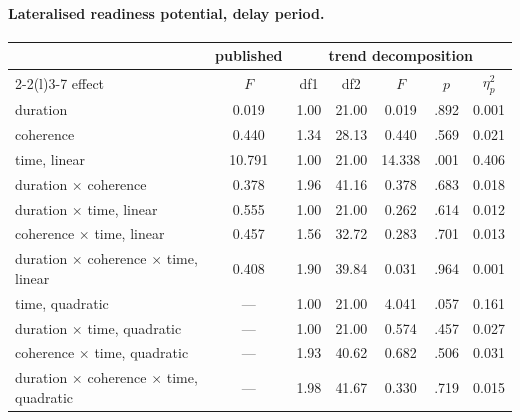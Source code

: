 \paragraph{Lateralised readiness potential, delay period.}
\begin{center}\small
\begin{tabular}{lcccccc}
\toprule
 & \multicolumn{1}{c}{published} & \multicolumn{5}{c}{trend decomposition}\\
\cmidrule(lr){2-2}\cmidrule(l){3-7}
effect & $F$ & df1 & df2 & $F$ & $p$ & $\eta_p^2$\\
\midrule
duration & 0.019 & 1.00 & 21.00 & 0.019 & .892 & 0.001\\
coherence & 0.440 & 1.34 & 28.13 & 0.440 & .569 & 0.021\\
time, linear & 10.791 & 1.00 & 21.00 & 14.338 & .001 & 0.406\\
duration $\times$ coherence & 0.378 & 1.96 & 41.16 & 0.378 & .683 & 0.018\\
duration $\times$ time, linear & 0.555 & 1.00 & 21.00 & 0.262 & .614 & 0.012\\
coherence $\times$ time, linear & 0.457 & 1.56 & 32.72 & 0.283 & .701 & 0.013\\
duration $\times$ coherence $\times$ time, linear & 0.408 & 1.90 & 39.84 & 0.031 & .964 & 0.001\\
time, quadratic & --- & 1.00 & 21.00 & 4.041 & .057 & 0.161\\
duration $\times$ time, quadratic & --- & 1.00 & 21.00 & 0.574 & .457 & 0.027\\
coherence $\times$ time, quadratic & --- & 1.93 & 40.62 & 0.682 & .506 & 0.031\\
duration $\times$ coherence $\times$ time, quadratic & --- & 1.98 & 41.67 & 0.330 & .719 & 0.015\\
\bottomrule
\end{tabular}
\end{center}

